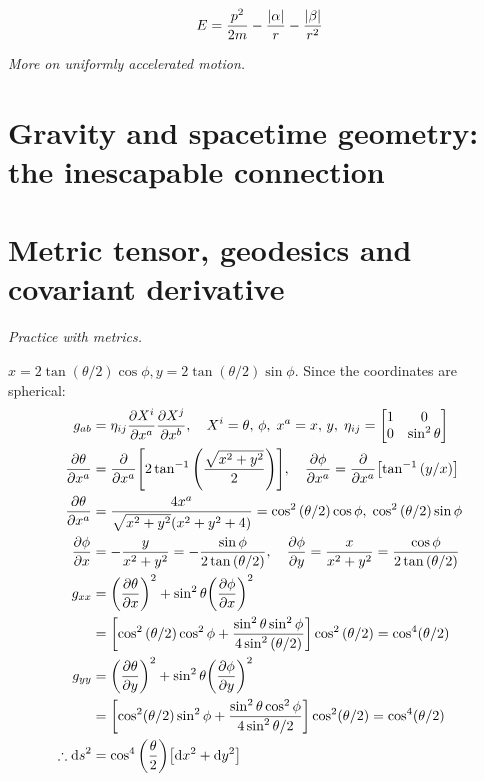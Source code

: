 \documentclass{report}
\begin{document}
\begin{subquests}
\begin{subquests}
		\item
		\begin{align*}
			E = \frac{p^2}{2m} - \frac{\abs{\alpha}}{r} - \frac{\abs{\beta}}{r^2}
		\end{align*}
	\end{subquests}

	\item \emph{More on uniformly accelerated motion.}

\end{subquests}
	
\chapter{Gravity and spacetime geometry: the inescapable connection}


\chapter{Metric tensor, geodesics and covariant derivative}

\begin{subquests}
	\item \emph{Practice with metrics.}
	\begin{subquests}
		\item $x = 2\tan(\theta/2)\cos\phi, y = 2\tan(\theta/2)\sin\phi$. Since the coordinates are spherical:
		\begin{align*}
			g_{ab} & = \eta_{ij}\pdv{X^i}{x^a}\pdv{X^j}{x^b}, \quad X^i = \theta,\,\phi,\; x^a = x,\,y, \;\eta_{ij} = \mqty[1 & 0 \\ 0 & \sin^2\theta]  \\
			\pdv{\theta}{x^a} & = \pdv{x^a}\bqty{2\tan^{-1}\pqty{\frac{\sqrt{x^2 + y^2}}{2}}}, \quad \pdv{\phi}{x^a} = \pdv{x^a}\bqty{\tan^{-1}\pqty{y/x}} \\
			\pdv{\theta}{x^a} & = \frac{4x^a}{\sqrt{x^2 + y^2}\pqty{x^2 + y^2 + 4}} = \cos^2\pqty{\theta/2}\cos\phi,\;\cos^2\pqty{\theta/2}\sin\phi \\
			\quad \pdv{\phi}{x} & = -\frac{y}{x^2 + y^2} = -\frac{\sin\phi}{2\tan\pqty{\theta/2}}, \quad \pdv{\phi}{y}  = \frac{x}{x^2 + y^2} = \frac{\cos\phi}{2\tan\pqty{\theta/2}} \\
			g_{xx} & = \pqty{\pdv{\theta}{x}}^2 + \sin^2\theta\pqty{\pdv{\phi}{x}}^2 \\
			& = \bqty{\cos^2\pqty{\theta/2}\cos^2\phi + \frac{\sin^2\theta\sin^2\phi}{4\sin^2\pqty{\theta/2}}}\cos^2\pqty{\theta/2} = \cos^4(\theta/2) \\
			g_{yy} & = \pqty{\pdv{\theta}{y}}^2 + \sin^2\theta\pqty{\pdv{\phi}{y}}^2 \\
			& = \bqty{\cos^2(\theta/2)\sin^2\phi + \frac{\sin^2\theta\cos^2\phi}{4\sin^2{\theta/2}}}\cos^2(\theta/2) = \cos^4(\theta/2) \\
			\therefore \dd{s}^2 & = \cos^4\pqty{\frac{\theta}{2}}\bqty{\dd x^2 + \dd y^2}
		\end{align*}
	\end{subquests}
\end{subquests}
\end{document}
